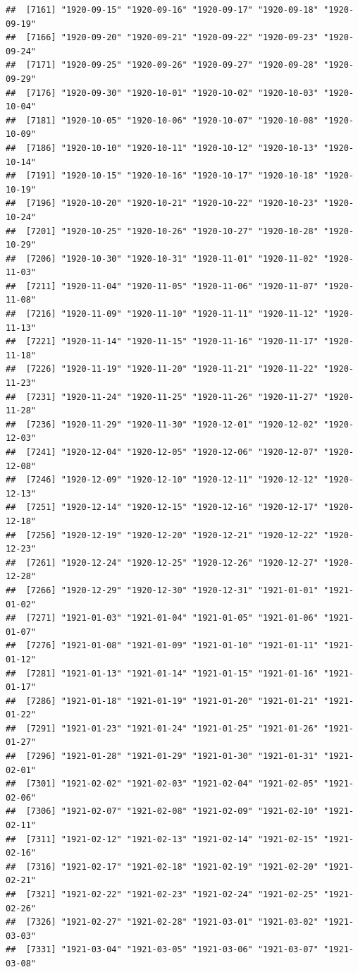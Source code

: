 \documentclass{article}\usepackage[]{graphicx}\usepackage[]{color}
\makeatletter
\newenvironment{kframe}{%
 \def\at@end@of@kframe{}%
 \ifinner\ifhmode%
  \def\at@end@of@kframe{\end{minipage}}%
  \begin{minipage}{\columnwidth}%
 \fi\fi%
 \def\FrameCommand##1{\hskip\@totalleftmargin \hskip-\fboxsep
 \colorbox{shadecolor}{##1}\hskip-\fboxsep
     \hskip-\linewidth \hskip-\@totalleftmargin \hskip\columnwidth}%
 \MakeFramed {\advance\hsize-\width
   \@totalleftmargin\z@ \linewidth\hsize
   \@setminipage}}%
 {\par\unskip\endMakeFramed%
 \at@end@of@kframe}
\newenvironment{knitrout}{}{} %
\makeatother
\begin{document}
\begin{description}
\begin{knitrout}
\begin{kframe}
\begin{verbatim}
##  [7161] "1920-09-15" "1920-09-16" "1920-09-17" "1920-09-18" "1920-09-19"
##  [7166] "1920-09-20" "1920-09-21" "1920-09-22" "1920-09-23" "1920-09-24"
##  [7171] "1920-09-25" "1920-09-26" "1920-09-27" "1920-09-28" "1920-09-29"
##  [7176] "1920-09-30" "1920-10-01" "1920-10-02" "1920-10-03" "1920-10-04"
##  [7181] "1920-10-05" "1920-10-06" "1920-10-07" "1920-10-08" "1920-10-09"
##  [7186] "1920-10-10" "1920-10-11" "1920-10-12" "1920-10-13" "1920-10-14"
##  [7191] "1920-10-15" "1920-10-16" "1920-10-17" "1920-10-18" "1920-10-19"
##  [7196] "1920-10-20" "1920-10-21" "1920-10-22" "1920-10-23" "1920-10-24"
##  [7201] "1920-10-25" "1920-10-26" "1920-10-27" "1920-10-28" "1920-10-29"
##  [7206] "1920-10-30" "1920-10-31" "1920-11-01" "1920-11-02" "1920-11-03"
##  [7211] "1920-11-04" "1920-11-05" "1920-11-06" "1920-11-07" "1920-11-08"
##  [7216] "1920-11-09" "1920-11-10" "1920-11-11" "1920-11-12" "1920-11-13"
##  [7221] "1920-11-14" "1920-11-15" "1920-11-16" "1920-11-17" "1920-11-18"
##  [7226] "1920-11-19" "1920-11-20" "1920-11-21" "1920-11-22" "1920-11-23"
##  [7231] "1920-11-24" "1920-11-25" "1920-11-26" "1920-11-27" "1920-11-28"
##  [7236] "1920-11-29" "1920-11-30" "1920-12-01" "1920-12-02" "1920-12-03"
##  [7241] "1920-12-04" "1920-12-05" "1920-12-06" "1920-12-07" "1920-12-08"
##  [7246] "1920-12-09" "1920-12-10" "1920-12-11" "1920-12-12" "1920-12-13"
##  [7251] "1920-12-14" "1920-12-15" "1920-12-16" "1920-12-17" "1920-12-18"
##  [7256] "1920-12-19" "1920-12-20" "1920-12-21" "1920-12-22" "1920-12-23"
##  [7261] "1920-12-24" "1920-12-25" "1920-12-26" "1920-12-27" "1920-12-28"
##  [7266] "1920-12-29" "1920-12-30" "1920-12-31" "1921-01-01" "1921-01-02"
##  [7271] "1921-01-03" "1921-01-04" "1921-01-05" "1921-01-06" "1921-01-07"
##  [7276] "1921-01-08" "1921-01-09" "1921-01-10" "1921-01-11" "1921-01-12"
##  [7281] "1921-01-13" "1921-01-14" "1921-01-15" "1921-01-16" "1921-01-17"
##  [7286] "1921-01-18" "1921-01-19" "1921-01-20" "1921-01-21" "1921-01-22"
##  [7291] "1921-01-23" "1921-01-24" "1921-01-25" "1921-01-26" "1921-01-27"
##  [7296] "1921-01-28" "1921-01-29" "1921-01-30" "1921-01-31" "1921-02-01"
##  [7301] "1921-02-02" "1921-02-03" "1921-02-04" "1921-02-05" "1921-02-06"
##  [7306] "1921-02-07" "1921-02-08" "1921-02-09" "1921-02-10" "1921-02-11"
##  [7311] "1921-02-12" "1921-02-13" "1921-02-14" "1921-02-15" "1921-02-16"
##  [7316] "1921-02-17" "1921-02-18" "1921-02-19" "1921-02-20" "1921-02-21"
##  [7321] "1921-02-22" "1921-02-23" "1921-02-24" "1921-02-25" "1921-02-26"
##  [7326] "1921-02-27" "1921-02-28" "1921-03-01" "1921-03-02" "1921-03-03"
##  [7331] "1921-03-04" "1921-03-05" "1921-03-06" "1921-03-07" "1921-03-08"

\end{verbatim}
\end{kframe}
\end{knitrout}
\end{description}
\end{document}
